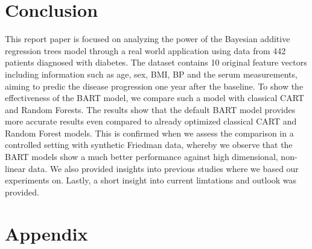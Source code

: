 \documentclass{usiinftr}
\begin{document}
\section{Conclusion}
This report paper is focused on analyzing the power of the Bayesian additive regression trees model through a real world application using data from 442 patients diagnosed with diabetes. The dataset contains 10 original feature vectors including information such as age, sex, BMI, BP and the serum measurements, aiming to predic the disease progression one year after the baseline. To show the effectiveness of the BART model, we compare such a model with classical CART and Random Forests. The results show that the default BART model provides more accurate results even compared to already optimized classical CART and Random Forest models. This is confirmed when we assess the comparison in a controlled setting with synthetic Friedman data, whereby we observe that the BART models show a much better performance against high dimensional, non-linear data. We also provided insights into previous studies where we based our experiments on. Lastly, a short insight into current limtations and outlook was provided.





\section{Appendix}
\end{document}
